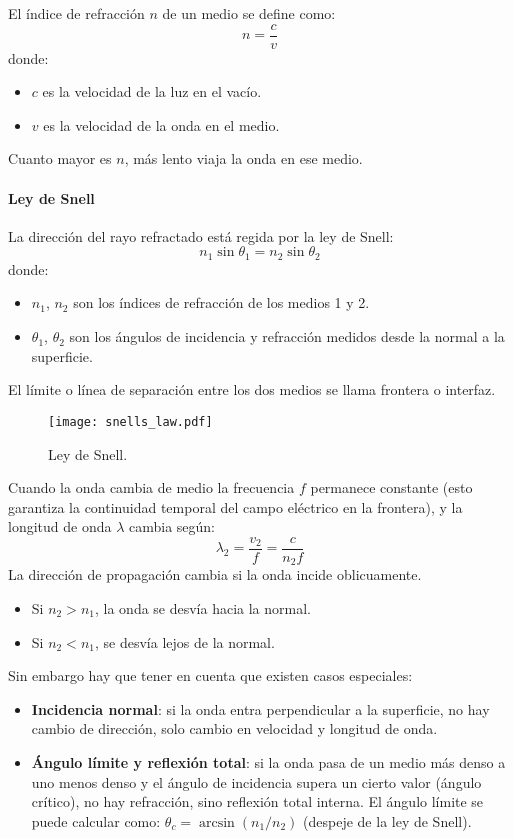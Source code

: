 El índice de refracción \(n\) de un medio se define como:
\[
n = \frac{c}{v}
\]
donde:
\begin{itemize}
  \item \(c\) es la velocidad de la luz en el vacío.
  \item \(v\) es la velocidad de la onda en el medio.
\end{itemize}
Cuanto mayor es \(n\), más lento viaja la onda en ese medio.

\paragraph{Ley de Snell}

La dirección del rayo refractado está regida por la ley de Snell:
\[
n_1 \sin \theta_1 = n_2 \sin \theta_2
\]
donde:
\begin{itemize}
  \item \(n_1\), \(n_2\) son los índices de refracción de los medios 1 y 2.
  \item \(\theta_1\), \(\theta_2\) son los ángulos de incidencia y refracción medidos desde la normal a la superficie.
\end{itemize}

El límite o línea de separación entre los dos medios se llama frontera o interfaz.

\begin{figure}[ht]
  \centering
  \texttt{[image: snells\_law.pdf]}
  \caption{Ley de Snell.}
  \label{fig:snells_law}
\end{figure}

Cuando la onda cambia de medio la frecuencia \(f\) permanece constante (esto garantiza la continuidad temporal del campo eléctrico en la frontera), y la longitud de onda \(\lambda\) cambia según:
\[
\lambda_2 = \frac{v_2}{f} = \frac{c}{n_2 f}
\]
La dirección de propagación cambia si la onda incide oblicuamente.
\begin{itemize}
  \item Si \(n_2 > n_1\), la onda se desvía hacia la normal.
  \item Si \(n_2 < n_1\), se desvía lejos de la normal.
\end{itemize}
Sin embargo hay que tener en cuenta que existen casos especiales:
\begin{itemize}
  \item \textbf{Incidencia normal}: si la onda entra perpendicular a la superficie, no hay cambio de dirección, solo cambio en velocidad y longitud de onda.
  \item \textbf{Ángulo límite y reflexión total}: si la onda pasa de un medio más denso a uno menos denso y el ángulo de incidencia supera un cierto valor (ángulo crítico), no hay refracción, sino reflexión total interna. El ángulo límite se puede calcular como: \(\theta_c = \arcsin \left(n_1/n_2\right)\) (despeje de la ley de Snell).
\end{itemize}


